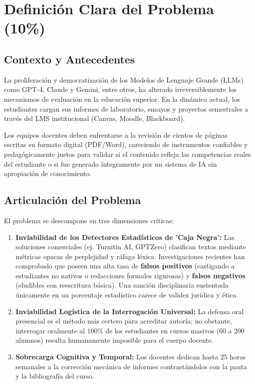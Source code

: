 \documentclass[11pt,a4paper]{article}
\begin{document}
\tableofcontents
\newpage

\section{Definición Clara del Problema (10\%)}

\subsection{Contexto y Antecedentes}
La proliferación y democratización de los Modelos de Lenguaje Grande (LLMs) como GPT-4, Claude y Gemini, entre otros, ha alterado irreversiblemente los mecanismos de evaluación en la educación superior. En la dinámica actual, los estudiantes cargan sus informes de laboratorio, ensayos y proyectos semestrales a través del LMS institucional (Canvas, Moodle, Blackboard).

Los equipos docentes deben enfrentarse a la revisión de cientos de páginas escritas en formato digital (PDF/Word), careciendo de instrumentos confiables y pedagógicamente justos para validar si el contenido refleja las competencias reales del estudiante o si fue generado íntegramente por un sistema de IA sin apropiación de conocimiento.

\subsection{Articulación del Problema}
El problema se descompone en tres dimensiones críticas:

\begin{enumerate}[label=\textbf{\arabic*.}]
    \item \textbf{Inviabilidad de los Detectores Estadísticos de 'Caja Negra':} Las soluciones comerciales (ej. Turnitin AI, GPTZero) clasifican textos mediante métricas opacas de perplejidad y ráfaga léxica. Investigaciones recientes han comprobado que poseen una alta tasa de \textbf{falsos positivos} (castigando a estudiantes no nativos o redacciones formales rigurosas) y \textbf{falsos negativos} (eludibles con reescritura básica). Una sanción disciplinaria sustentada únicamente en un porcentaje estadístico carece de validez jurídica y ética.
    \item \textbf{Inviabilidad Logística de la Interrogación Universal:} La defensa oral presencial es el método más certero para acreditar autoría; no obstante, interrogar oralmente al $100\%$ de los estudiantes en cursos masivos (60 a 200 alumnos) resulta humanamente imposible para el cuerpo docente.
    \item \textbf{Sobrecarga Cognitiva y Temporal:} Los docentes dedican hasta 25 horas semanales a la corrección mecánica de informes contrastándolos con la pauta y la bibliografía del curso.
\end{enumerate}
\end{document}
